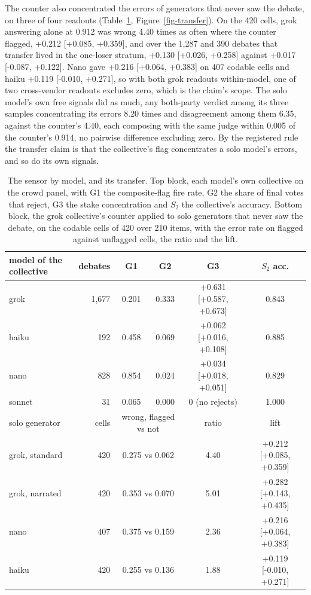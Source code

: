 The counter also concentrated the errors of generators that never saw the
debate, on three of four readouts (Table~\ref{tab-sensor},
Figure~\ref{fig-transfer}). On the 420 cells, grok answering alone at
0.912 was wrong 4.40 times as often where the counter flagged,
+0.212 [+0.085, +0.359],
and over the 1,287 and 390 debates that transfer lived in the one-loser
stratum, +0.130 [+0.026, +0.258] against +0.017 [-0.087, +0.122].
Nano gave +0.216 [+0.064, +0.383] on 407 codable cells and haiku +0.119
[-0.010, +0.271], so with both grok readouts within-model, one of two
cross-vendor readouts excludes zero, which is the claim's scope.
The solo model's own free signals did as much, any both-party verdict
among its three samples concentrating its errors 8.20 times and
disagreement among them 6.35, against the counter's 4.40, each composing
with the same judge within 0.005 of the counter's 0.914, no pairwise
difference excluding zero.
By the registered rule the transfer claim is that the collective's flag
concentrates a solo model's errors, and so do its own signals.

\begin{table}[t]
\centering
\caption{The sensor by model, and its transfer. Top block, each model's own
collective on the crowd panel, with G1 the composite-flag fire rate, G2 the
share of final votes that reject, G3 the stake concentration and $S_2$ the
collective's accuracy. Bottom block, the grok collective's counter applied
to solo generators that never saw the debate, on the codable cells of 420
over 210 items, with the error rate on flagged against unflagged cells, the
ratio and the lift.}
\label{tab-sensor}
\footnotesize
\setlength{\tabcolsep}{2.5pt}
\begin{tabular}{lrcccc}
\toprule
model of the collective & debates & G1 & G2 & G3 & $S_2$ acc. \\
\midrule
grok   & 1,677 & 0.201 & 0.333 & +0.631 [+0.587, +0.673] & 0.843 \\
haiku  & 192   & 0.458 & 0.069 & +0.062 [+0.016, +0.108] & 0.885 \\
nano   & 828   & 0.854 & 0.024 & +0.034 [+0.018, +0.051] & 0.829 \\
sonnet & 31    & 0.065 & 0.000 & 0 (no rejects)          & 1.000 \\
\midrule
solo generator & cells & \multicolumn{2}{c}{wrong, flagged vs not} & ratio & lift \\
\midrule
grok, standard & 420 & \multicolumn{2}{c}{0.275 vs 0.062} & 4.40 & +0.212 [+0.085, +0.359] \\
grok, narrated & 420 & \multicolumn{2}{c}{0.353 vs 0.070} & 5.01 & +0.282 [+0.143, +0.435] \\
nano           & 407 & \multicolumn{2}{c}{0.375 vs 0.159} & 2.36 & +0.216 [+0.064, +0.383] \\
haiku          & 420 & \multicolumn{2}{c}{0.255 vs 0.136} & 1.88 & +0.119 [-0.010, +0.271] \\
\bottomrule
\end{tabular}
\end{table}

